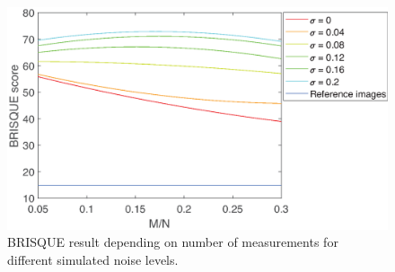 \begin{figure}[H]
    \centering
    \includegraphics[width = 0.95\linewidth]{result/synt_brisque/Brisque_fit_flat3.eps}
    \caption{BRISQUE result depending on number of measurements for different simulated noise levels.}
    \label{fig:Brisque_2d}
\end{figure}







